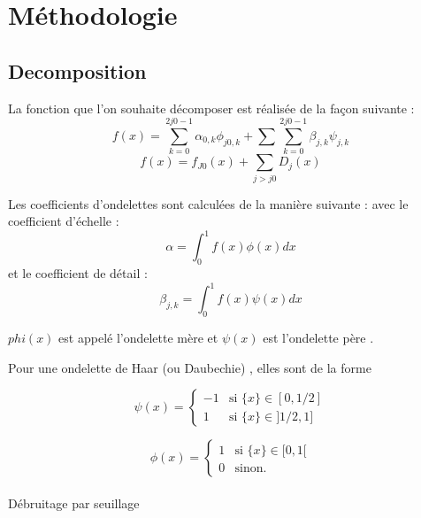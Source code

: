 \section{Méthodologie}

\subsection{Decomposition}
La fonction que l'on souhaite décomposer est réalisée de la façon suivante :
\begin{equation}
f(x)= \sum^{2j0-1}_{k=0} \alpha_{0,k}\phi_{j0,k} +\sum \sum^{2j0-1}_{k=0}\beta_{j,k}\psi_{j,k}
\end{equation}
\begin{equation}
f(x) =f_{J0}(x) +\sum_{j>j0} D_{j}(x)
\end{equation}

Les coefficients d'ondelettes sont calculées de la manière suivante :
avec le coefficient d'échelle :
\begin{equation}
\alpha = \int^{1}_{0}f(x)\phi(x)dx
\end{equation}
et le coefficient de détail :
\begin{equation}
\beta_{j,k} = \int^{1}_{0}f(x)\psi(x)dx
\end{equation}

$phi(x)$ est appelé l'ondelette mère
et $\psi(x) $ est l'ondelette père .

Pour une ondelette de Haar (ou Daubechie) , elles sont de la forme 



\begin{equation}
\psi(x) = \left\{
    \begin{array}{ll}
        -1 & \mbox{si } \{x\} \in [0,1/2] \\
        1 & \mbox{si } \{x\} \in ]1/2,1]
    \end{array}
\right.
\end{equation}


\begin{equation}
\phi(x) = \left\{
    \begin{array}{ll}
        1 & \mbox{si } \{x\} \in [0,1[ \\
        0 & \mbox{sinon.} 
     \end{array}
\right.
\end{equation}



\paragraph{}
Débruitage par seuillage
